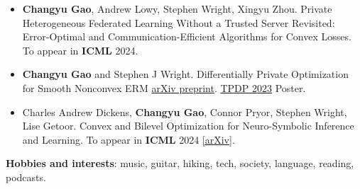\documentclass[letterpaper,12pt]{article}
\begin{document}
\begin{itemize}[leftmargin=*, label={}]
  \item 	
  \textbf{Changyu Gao}, Andrew Lowy, Stephen Wright, Xingyu Zhou. Private Heterogeneous Federated Learning Without a Trusted Server Revisited: Error-Optimal and Communication-Efficient Algorithms for Convex Losses. To appear in \textbf{ICML} 2024.

  \item 
  \textbf{Changyu Gao} and Stephen J Wright. Differentially Private Optimization for Smooth Nonconvex ERM
  \href{https://arxiv.org/abs/2302.04972}{arXiv preprint}. \href{https://tpdp.journalprivacyconfidentiality.org/2023/}{TPDP 2023} Poster.

  \item
  Charles Andrew Dickens, \textbf{Changyu Gao}, Connor Pryor, Stephen Wright, Lise Getoor.
  Convex and Bilevel Optimization for Neuro-Symbolic Inference and Learning.
  To appear in \textbf{ICML} 2024 \href{https://arxiv.org/abs/2401.09651}{[arXiv]}.

\end{itemize}
\vspace{0.2cm}
\textbf{Hobbies and interests}: music, guitar, hiking, tech, society, language, reading, podcasts.

\end{document}
